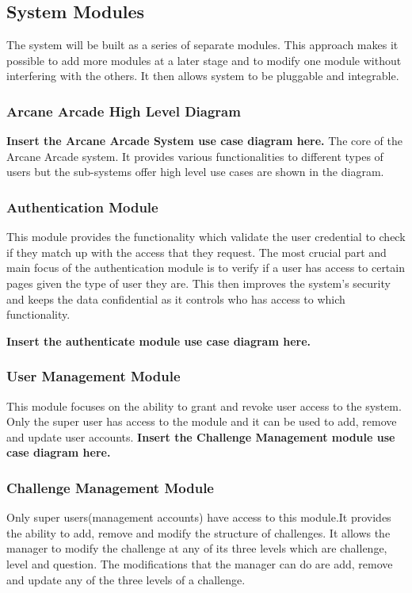 \documentclass[english]{article}
\begin{document}
		\subsection{System Modules}
		The system will be built as a series of separate modules. This approach makes it possible to add more modules at a later stage and to modify one module without interfering with the others. It then allows system to be pluggable and integrable.
		\subsubsection{Arcane Arcade High Level Diagram}
		\textbf{Insert the Arcane Arcade System use case diagram here.} \newline
		The core of the Arcane Arcade system. It provides various functionalities to different types of users but the sub-systems offer high level use cases are shown in the diagram.
		\subsubsection{Authentication Module}
		This module provides the functionality which validate the user credential to check if they match up with the access that they request. The most crucial part and main focus of the authentication module is to verify if a user has access to certain pages given the type of user they are. This then improves the system's security and keeps the data confidential as it controls who has access to which functionality.
		
\textbf{Insert the authenticate module use case diagram here.} \newline

		\subsubsection{User Management Module}
		This module focuses on the ability to grant and revoke user access to the system. Only the super user has access to the module and it can be used to add, remove and update user accounts.
\textbf{Insert the Challenge Management module use case diagram here.} \newline

		\subsubsection{Challenge Management Module}
		Only super users(management accounts) have access to this module.It provides the ability to add, remove and modify the structure of challenges. It allows the manager to modify the challenge at any of its three levels which are challenge, level and question. The modifications that the manager can do are add, remove and update any of the three levels of a challenge.
		
\end{document}
